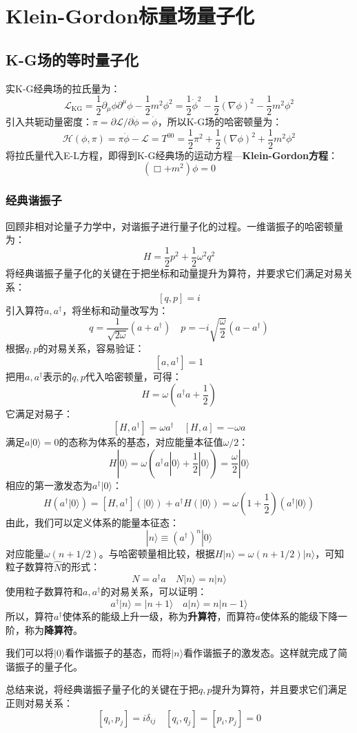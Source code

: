\documentclass{book}
\begin{document}
\chapter{Klein-Gordon标量场量子化}
\section{K-G场的等时量子化}
实K-G经典场的拉氏量为：
$$
\mathcal{L}_{\mathrm{KG}}=\frac{1}{2}\partial_{\mu}\phi\partial^{\mu}\phi-\frac{1}{2}m^2\phi^2=\frac{1}{2}\dot{\phi}^2-\frac12(\nabla\phi)^2-\frac12 m^2\phi^2
$$
引入共轭动量密度：$\pi=\partial \mathcal{L}/\partial\dot{\phi}=\dot{\phi}$，所以K-G场的哈密顿量为：
$$
\mathcal{H}(\phi,\pi)=\pi\dot{\phi}-\mathcal{L}=T^{00}=\frac12\pi^2+\frac12(\nabla\phi)^2+\frac12m^2\phi^2
$$
将拉氏量代入E-L方程，即得到K-G经典场的运动方程—\textbf{Klein-Gordon方程}：
$$
(\Box+m^2)\phi=0
$$
\subsection{经典谐振子}
回顾非相对论量子力学中，对谐振子进行量子化的过程。一维谐振子的哈密顿量为：
$$
H=\frac{1}{2}p^2+\frac12 \omega^2q^2
$$
将经典谐振子量子化的关键在于把坐标和动量提升为算符，并要求它们满足对易关系：
$$
[q,p]=i
$$
引入算符$a,a^\dagger$，将坐标和动量改写为：
$$
q=\frac1{\sqrt{2\omega}}(a+a^\dagger)\quad p=-i\sqrt{\frac\omega2}(a-a^\dagger)
$$
根据$q,p$的对易关系，容易验证：
$$
[a,a^\dagger]=1
$$
把用$a,a^\dagger$表示的$q,p$代入哈密顿量，可得：
$$
H=\omega(a^\dagger a+\frac12)
$$
它满足对易子：
$$
[H,a^\dagger]=\omega a^\dagger\quad [H,a]=-\omega a
$$
满足$a|0\rangle=0$的态称为体系的基态，对应能量本征值$\omega/2$：
$$
H|0\rangle=\omega(a^\dagger a|0\rangle+\frac12 |0\rangle)=\frac\omega2|0\rangle
$$
相应的第一激发态为$a^\dagger|0\rangle$：
$$
H(a^\dagger|0\rangle)=[H,a^\dagger](|0\rangle)+a^\dagger H(|0\rangle)=\omega(1+\frac12)(a^\dagger|0\rangle)
$$
由此，我们可以定义体系的能量本征态：
$$
|n\rangle\equiv(a^\dagger)^n |0\rangle
$$
对应能量$\omega(n+1/2)$。与哈密顿量相比较，根据$H|n\rangle=\omega(n+1/2)|n\rangle$，可知粒子数算符$\hat{N}$的形式：
$$
N=a^\dagger a\quad N|n\rangle=n|n\rangle
$$
使用粒子数算符和$a,a^\dagger$的对易关系，可以证明：
$$
a^\dagger|n\rangle=|n+1\rangle \quad a|n\rangle=n|n-1\rangle
$$
所以，算符$a^\dagger$使体系的能级上升一级，称为\textbf{升算符}，而算符$a$使体系的能级下降一阶，称为\textbf{降算符}。

我们可以将$|0\rangle$看作谐振子的基态，而将$|n\rangle$看作谐振子的激发态。这样就完成了简谐振子的量子化。

总结来说，将经典谐振子量子化的关键在于把$q,p$提升为算符，并且要求它们满足正则对易关系：
$$
[q_i,p_j]=i\delta_{ij}\quad [q_i,q_j]=[p_i,p_j]=0
$$
\end{document}
